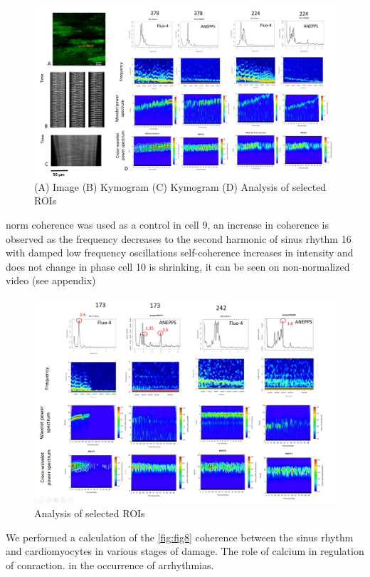 \documentclass{biophys-new}
\begin{document}
\begin{figure}[hbt!]
\centering
\includegraphics[width=0.9\linewidth]{fig10.png}
\caption{ (A) Image (B) Kymogram (C) Kymogram (D) Analysis of selected ROIs }
\label{fig:fig10}
\end{figure}


norm coherence was used as a control
in cell 9, an increase in coherence is observed as the frequency decreases to the second harmonic of sinus rhythm
16 with damped low frequency oscillations
self-coherence increases in intensity and does not change in phase
cell 10 is shrinking, it can be seen on non-normalized video (see appendix)

\begin{figure}[hbt!]
\centering
\includegraphics[width=0.9\linewidth]{fig11.png}
\caption{ Analysis of selected ROIs }
\label{fig:fig11}
\end{figure}


We performed a calculation of the \ref{fig:fig8} coherence between the sinus rhythm and cardiomyocytes in various stages of damage.
The role of calcium in regulation of conraction.
in the occurrence of arrhythmias.
\end{document}
